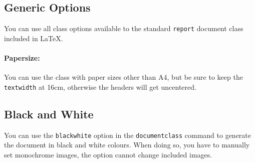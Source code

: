 \documentclass[
]{dragonbane-supplement}
\begin{document}

\begin{segment}
\subsection{Generic Options}
You can use all class options available to the standard \texttt{report} document class included in LaTeX.

\paragraph{Papersize:} You can use the class with paper sizes other than A4, but be sure to keep the \texttt{textwidth} at 16cm, otherwise the headers will get uncentered.

\subsection{Black and White}
You can use the \texttt{blackwhite} option in the \texttt{documentclass} command to generate the document in black and white colours. When doing so, you have to manually set monochrome images, the option cannot change included images.
\end{segment}

\end{document}
